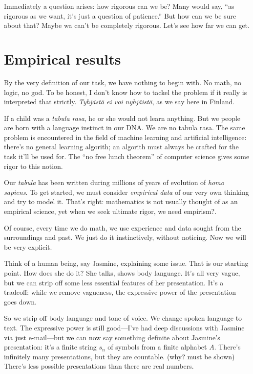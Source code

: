 \documentclass[11pt,oneside,%
]{memoir}
\theoremstyle{definition}
\begin{document}
Immediately a question arises: how rigorous can we be? Many would say, ``as rigorous as we want, it's just a question of patience.'' But how can we be sure about that? Maybe wa can't be completely rigorous. Let's see how far we can get.

\section{Empirical results}

By the very definition of our task, we have nothing to begin with. No math, no logic, no god. To be honest, I don't know how to tackel the problem if it really is interpreted that strictly. \emph{Tyhjästä ei voi nyhjäistä}, as we say here in Finland.

If a child was a \emph{tabula rasa}, he or she would not learn anything. But we people are born with a language instinct in our DNA. We are no tabula rasa. The same problem is encountered in the field of machine learning and artificial intelligence: there's no general learning algorith; an algorith must always be crafted for the task it'll be used for. The ``no free lunch theorem'' of computer science gives some rigor to this notion.

Our \emph{tabula} has been written during millions of years of evolution of \emph{homo sapiens}. To get started, we must consider \emph{empirical data} of our very own thinking and try to model it. That's right: mathematics is not usually thought of as an empirical science, yet when we seek ultimate rigor, we need empirism?.

Of course, every time we do math, we use experience and data sought from the surroundings and past. We just do it instinctively, without noticing. Now we will be very explicit.

Think of a human being, say Jasmine, explaining some issue. That is our starting point. How does she do it? She talks, shows body language. It's all very vague, but we can strip off some less essential features of her presentation. It's a tradeoff: while we remove vagueness, the expressive power of the presentation goes down.

So we strip off body language and tone of voice. We change spoken language to text. The expressive power is still good---I've had deep discussions with Jasmine via just e-mail---but we can now say something definite about Jasmine's presentation: it's a finite string \(s_n\) of symbols from a finite alphabet \(A\). There's infinitely many presentations, but they are countable. (why? must be shown) There's less possible presentations than there are real numbers.
\end{document}
